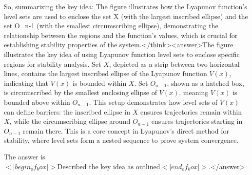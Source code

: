 So, summarizing the key idea: The figure illustrates how the Lyapunov function's level sets are used to enclose the set X (with the largest inscribed ellipse) and the set O_{n-1} (with the smallest circumscribing ellipse), demonstrating the relationship between the regions and the function's values, which is crucial for establishing stability properties of the system.</think><answer>The figure illustrates the key idea of using Lyapunov function level sets to enclose specific regions for stability analysis. Set \( X \), depicted as a strip between two horizontal lines, contains the largest inscribed ellipse of the Lyapunov function \( V(x) \), indicating that \( V(x) \) is bounded within \( X \). Set \( O_{n-1} \), shown as a hatched box, is circumscribed by the smallest enclosing ellipse of \( V(x) \), meaning \( V(x) \) is bounded above within \( O_{n-1} \). This setup demonstrates how level sets of \( V(x) \) can define barriers: the inscribed ellipse in \( X \) ensures trajectories remain within \( X \), while the circumscribing ellipse around \( O_{n-1} \) ensures trajectories starting in \( O_{n-1} \) remain there. This is a core concept in Lyapunov's direct method for stability, where level sets form a nested sequence to prove system convergence.  

The answer is \(<|begin_of_box|>\text{Described the key idea as outlined}<|end_of_box|>\).</answer>